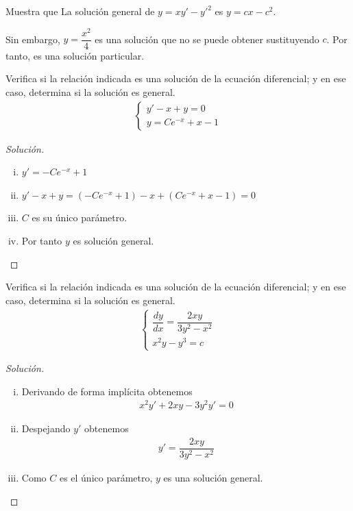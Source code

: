 	\begin{resuelto}
		Muestra que La solución general de $ y = xy'-y'^{2} $ es $ y = cx-c^{2} $.
		\begin{observacion}

			Sin embargo, $ y=\dfrac{x^{2}}{4} $ es una solución que no se puede obtener sustituyendo $ c $.  Por tanto, es una solución particular.
		\end{observacion}
	\end{resuelto}



\begin{resuelto}

	Verifica si la relación indicada es una solución de la ecuación diferencial; y en ese caso, determina si la solución es general.
\begin{align}
	\begin{cases}
		y'-x+y=0\\
		y = Ce^{-x}+x-1
	\end{cases}
\end{align}

\end{resuelto}


\begin{proof}[Solución]
	\begin{enumerate}[(i)]
		\item $y'=-Ce^{-x}+1$
		\item $y'-x+y= (-Ce^{-x}+1)-x+(Ce^{-x}+x-1)=0$
		\item $C$ es su único parámetro.
		\item Por tanto $y$ es solución general.
	\end{enumerate}
\end{proof}


\begin{resuelto}

	Verifica si la relación indicada es una solución de la ecuación diferencial; y en ese caso, determina si la solución es general.
\begin{align}
	\begin{cases}
		\dfrac{dy}{dx}=\dfrac{2xy}{3y^{2}-x^{2}}\\
		x^{2}y-y^{3}=c
	\end{cases}
\end{align}

\end{resuelto}



\begin{proof}[Solución]
	\begin{enumerate}[(i)]
		\item Derivando de forma implícita obtenemos
		\begin{align}
			x^{2}y'+2xy-3y^{2}y'=0
		\end{align}
		\item Despejando $y'$ obtenemos
		\begin{align}
			y'=\dfrac{2xy}{3y^{2}-x^{2}}
		\end{align}
		\item Como $C$ es el único parámetro, $y$ es una solución general.
	\end{enumerate}
\end{proof}


